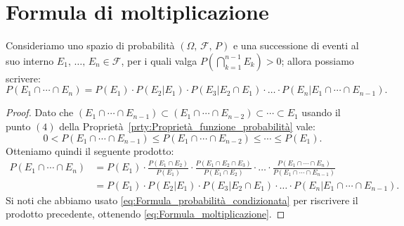     \section{Formula di moltiplicazione}
        \begin{defn}\label{defn:Formula_moltiplicazione}
            Consideriamo uno spazio di probabilità $(\Omega,\,\mathscr{F},\,P)$ e una successione di eventi al suo interno $E_1,\,\ldots,\,E_n \in \mathscr{F}$, per i quali valga $P(\bigcap_{k=1}^{n-1} E_k) > 0$; allora possiamo scrivere:
            \begin{equation}\label{eq:Formula_moltiplicazione}
                P(E_1 \cap \dotsm \cap E_n) = P(E_1) \cdot P(E_2|E_1) \cdot P(E_3|E_2 \cap E_1) \cdot \ldots \cdot P(E_n|E_1 \cap \dotsm \cap E_{n-1})
            .
            \end{equation}
        \end{defn}
        \begin{proof}
            Dato che $(E_1 \cap \dotsm \cap E_{n-1}) \subset (E_1 \cap \dotsm \cap E_{n-2}) \subset \dotsm \subset E_1$ usando il punto $(4)$ della Proprietà~\ref{prty:Proprietà_funzione_probabilità} vale: \[
                0 < P(E_1 \cap \dotsm \cap E_{n-1}) \leq P(E_1 \cap \dotsm \cap E_{n-2}) \leq \dotsm \leq P(E_1)
            .\]
            Otteniamo quindi il seguente prodotto:
            \begin{align*}
                P(E_1 \cap \dotsm \cap E_n) &= P(E_1) \cdot \frac{P(E_1 \cap E_2)}{P(E_1)} \cdot \frac{P(E_1 \cap E_2 \cap E_3)}{P(E_1 \cap E_2)} \cdot \ldots \cdot \frac{P(E_1 \cap \dotsm \cap E_n)}{P(E_1 \cap \dotsm \cap E_{n-1})} \\ &= P(E_1) \cdot P(E_2|E_1) \cdot P(E_3|E_2 \cap E_1) \cdot \ldots \cdot P(E_n|E_1 \cap \dotsm \cap E_{n-1})
            .
            \end{align*}
            Si noti che abbiamo usato \eqref{eq:Formula_probabilità_condizionata} per riscrivere il prodotto precedente, ottenendo \eqref{eq:Formula_moltiplicazione}.
        \end{proof}

